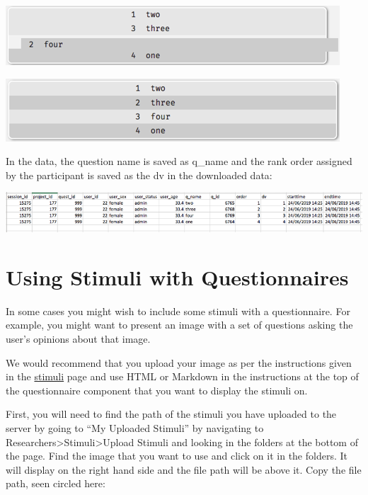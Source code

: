 \documentclass[]{book}
\begin{document}
\includegraphics{images/screenshots/rank2b.png}

\includegraphics{images/screenshots/rank2c.png}

In the data, the question name is saved as q\_name and the rank order
assigned by the participant is saved as the dv in the downloaded data:

\includegraphics{images/screenshots/rank3.png}

\hypertarget{assignstimquest}{\section{Using Stimuli with
Questionnaires}\label{assignstimquest}}

In some cases you might wish to include some stimuli with a
questionnaire. For example, you might want to present an image with a
set of questions asking the user's opinions about that image.

We would recommend that you upload your image as per the instructions
given in the \protect\hyperlink{stimuli}{stimuli} page and use HTML or
Markdown in the instructions at the top of the questionnaire component
that you want to display the stimuli on.

First, you will need to find the path of the stimuli you have uploaded
to the server by going to ``My Uploaded Stimuli'' by navigating to
Researchers\textgreater{}Stimuli\textgreater{}Upload Stimuli and looking
in the folders at the bottom of the page. Find the image that you want
to use and click on it in the folders. It will display on the right hand
side and the file path will be above it. Copy the file path, seen
circled here:
\end{document}
